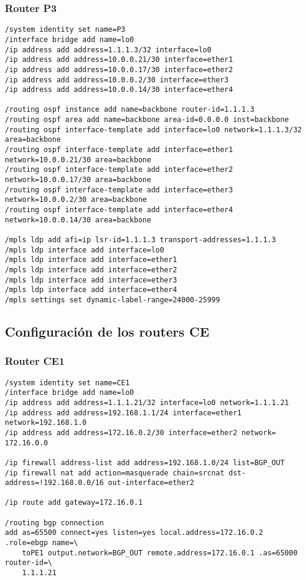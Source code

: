 \subsubsection*{Router P3}
\begin{lstlisting}[language=RouterOS]
/system identity set name=P3
/interface bridge add name=lo0
/ip address add address=1.1.1.3/32 interface=lo0
/ip address add address=10.0.0.21/30 interface=ether1
/ip address add address=10.0.0.17/30 interface=ether2
/ip address add address=10.0.0.2/30 interface=ether3
/ip address add address=10.0.0.14/30 interface=ether4

/routing ospf instance add name=backbone router-id=1.1.1.3
/routing ospf area add name=backbone area-id=0.0.0.0 inst=backbone
/routing ospf interface-template add interface=lo0 network=1.1.1.3/32 area=backbone
/routing ospf interface-template add interface=ether1 network=10.0.0.21/30 area=backbone
/routing ospf interface-template add interface=ether2 network=10.0.0.17/30 area=backbone
/routing ospf interface-template add interface=ether3 network=10.0.0.2/30 area=backbone
/routing ospf interface-template add interface=ether4 network=10.0.0.14/30 area=backbone

/mpls ldp add afi=ip lsr-id=1.1.1.3 transport-addresses=1.1.1.3
/mpls ldp interface add interface=lo0
/mpls ldp interface add interface=ether1
/mpls ldp interface add interface=ether2
/mpls ldp interface add interface=ether3
/mpls ldp interface add interface=ether4
/mpls settings set dynamic-label-range=24000-25999
\end{lstlisting}

\subsection{Configuración de los routers CE}
\label{Apendice2:configuracion_routers_ce}

\subsubsection*{Router CE1}
\begin{lstlisting}[language=RouterOS]
/system identity set name=CE1
/interface bridge add name=lo0
/ip address add address=1.1.1.21/32 interface=lo0 network=1.1.1.21
/ip address add address=192.168.1.1/24 interface=ether1 network=192.168.1.0
/ip address add address=172.16.0.2/30 interface=ether2 network= 172.16.0.0

/ip firewall address-list add address=192.168.1.0/24 list=BGP_OUT
/ip firewall nat add action=masquerade chain=srcnat dst-address=!192.168.0.0/16 out-interface=ether2

/ip route add gateway=172.16.0.1

/routing bgp connection
add as=65500 connect=yes listen=yes local.address=172.16.0.2 .role=ebgp name=\
    toPE1 output.network=BGP_OUT remote.address=172.16.0.1 .as=65000 router-id=\
    1.1.1.21
\end{lstlisting}


